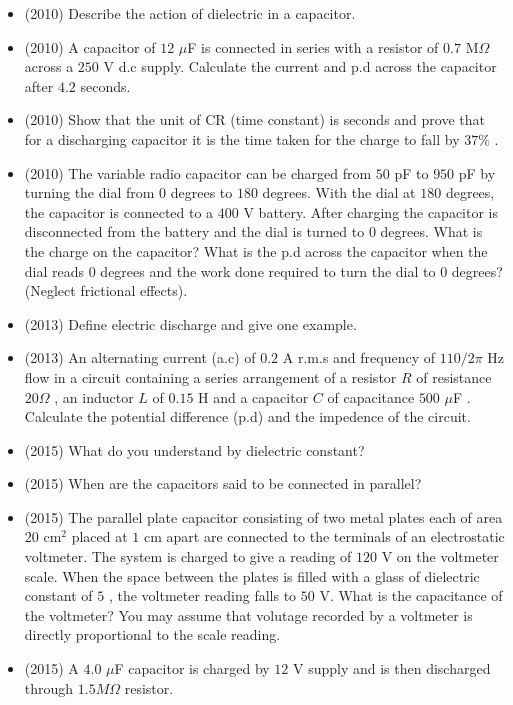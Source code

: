 \documentclass{article}
\begin{document}
\begin{itemize}
\item (2010)  Describe the action of dielectric in a capacitor.
\item (2010)  A capacitor of $ 12$ $\mu$F is connected in series with a resistor of $ 0.7$ M$ \Omega $ across a $ 250$ V d.c supply. Calculate the current and p.d across the capacitor after $ 4.2$ seconds.
\item (2010)  Show that the unit of CR (time constant) is seconds and prove that for a discharging capacitor it is the time taken for the charge to fall by $ 37\%$ . 
\item (2010)  The variable radio capacitor can be charged from $ 50$ pF to $ 950$ pF by turning the dial from $ 0$ degrees to $ 180$ degrees. With the dial at $ 180$ degrees, the capacitor is connected to a $ 400$ V battery. After charging the capacitor is disconnected from the battery and the dial is turned to $ 0$ degrees. What is the charge on the capacitor? What is the p.d across the capacitor when the dial reads $ 0$ degrees and the work done required to turn the dial to $ 0$ degrees? (Neglect frictional effects).
\item (2013)  Define electric discharge and give one example.
\item (2013)  An alternating current (a.c) of $ 0.2$ A r.m.s and frequency of $ 110/2\pi$ Hz flow in a circuit containing a series arrangement of a resistor $ R$ of resistance $ 20\Omega$ , an inductor $ L$ of $ 0.15$ H and a capacitor $ C$ of capacitance $ 500$ $\mu$F . Calculate the potential difference (p.d) and the impedence of the circuit.
\item (2015)  What do you understand by dielectric constant?
\item (2015)  When are the capacitors said to be connected in parallel?
\item (2015)  The parallel plate capacitor consisting of two metal plates each of area $ 20$ cm$ ^{2}$ placed at $ 1$ cm apart are connected to the terminals of an electrostatic voltmeter.  The system is charged to give a reading of $ 120$ V on the voltmeter scale.  When the space between the plates is filled with a glass of dielectric constant of $ 5$ , the voltmeter reading falls to $ 50$ V.  What is the capacitance of the voltmeter?  You may assume that volutage recorded by a voltmeter is directly proportional to the scale reading.
\item (2015)  A $ 4.0$ $\mu$F capacitor is charged by $ 12$ V supply and is then discharged through $ 1.5M\Omega $ resistor.  \begin{itemize}

\end{itemize}
\end{itemize}
\end{document}
